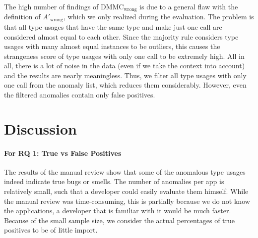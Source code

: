 The high number of findings of $\text{DMMC}_\text{wrong}$ is due to a general flaw with the definition of $A'_\text{wrong}$, which we only realized during the evaluation.
The problem is that all type usages that have the same type and make just one call are considered almost equal to each other.
Since the majority rule considers type usages with many almost equal instances to be outliers, this causes the strangeness score of type usages with only one call to be extremely high.
All in all, there is a lot of noise in the data (even if we take the context into account) and the results are nearly meaningless.
Thus, we filter all type usages with only one call from the anomaly list, which reduces them considerably.
However, even the filtered anomalies contain only false positives.

\section{Discussion}\label{sc:disc}

\paragraph{For RQ 1: True vs False Positives}

The results of the manual review show that some of the anomalous type usages indeed indicate true bugs or smells.
The number of anomalies per app is relatively small, such that a developer could easily evaluate them himself.
While the manual review was time-consuming, this is partially because we do not know the applications, a developer that is familiar with it would be much faster.
Because of the small sample size, we consider the actual percentages of true positives to be of little import.

